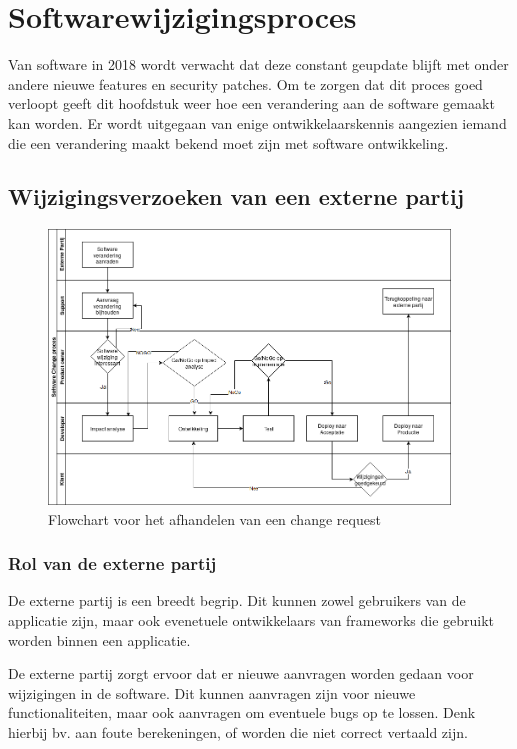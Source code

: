 \chapter{Softwarewijzigingsproces}
Van software in 2018 wordt verwacht dat deze constant geupdate blijft met onder andere nieuwe features en security patches.
Om te zorgen dat dit proces goed verloopt geeft dit hoofdstuk weer hoe een verandering aan de software gemaakt kan worden.
Er wordt uitgegaan van enige ontwikkelaarskennis aangezien iemand die een verandering maakt bekend moet zijn met software ontwikkeling.

\section{Wijzigingsverzoeken van een externe partij}
\begin{figure}[H]
	\centering
	\includegraphics[width=0.95\textwidth]{images/ChangeRequest.png}
	\caption{Flowchart voor het afhandelen van een change request}
	\label{fig:ChangeRequest}
\end{figure}

\subsection{Rol van de externe partij}
De externe partij is een breedt begrip. Dit kunnen zowel gebruikers van de applicatie zijn, maar ook evenetuele ontwikkelaars van frameworks die gebruikt worden binnen een applicatie.

De externe partij zorgt ervoor dat er nieuwe aanvragen worden gedaan voor wijzigingen in de software. Dit kunnen aanvragen zijn voor nieuwe functionaliteiten, maar ook aanvragen om eventuele bugs op te lossen. Denk hierbij bv. aan foute berekeningen, of worden die niet correct vertaald zijn.

